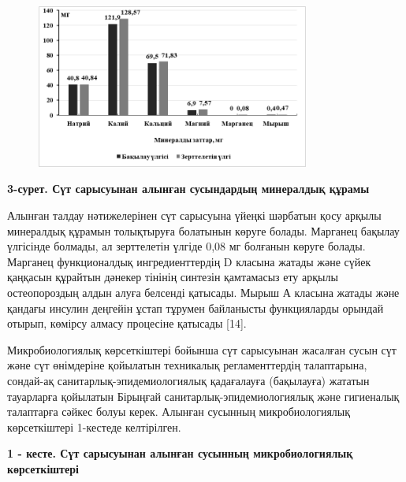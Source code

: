 {{\begin{figure}[H]
	\centering
	\includegraphics[width=0.8\textwidth]{media/pish4/image4}
	\caption*{}
\end{figure}


{\bfseries 3-сурет. Сүт сарысуынан алынған сусындардың минералдық құрамы}

Алынған талдау нәтижелерінен сүт сарысуына үйеңкі шәрбатын қосу арқылы
минералдық құрамын толықтыруға болатынын көруге болады. Марганец бақылау
үлгісінде болмады, ал зерттелетін үлгіде 0,08 мг болғанын көруге болады.
Марганец функционалдық ингредиенттердің D класына жатады және сүйек
қаңқасын құрайтын дәнекер тінінің синтезін қамтамасыз ету арқылы
остеопороздың алдын алуға белсенді қатысады. Мырыш А класына жатады және
қандағы инсулин деңгейін ұстап тұрумен байланысты функцияларды орындай
отырып, көмірсу алмасу процесіне қатысады {[}14{]}.

Микробиологиялық көрсеткіштері бойынша сүт сарысуынан жасалған сусын сүт
және сүт өнімдеріне қойылатын техникалық регламенттердің талаптарына,
сондай-ақ санитарлық-эпидемиологиялық қадағалауға (бақылауға) жататын
тауарларға қойылатын Бірыңғай санитарлық-эпидемиологиялық және
гигиеналық талаптарға сәйкес болуы керек. Алынған сусынның
микробиологиялық көрсеткіштері 1-кестеде келтірілген.

{\bfseries 1 - кесте. Сүт сарысуынан алынған сусынның микробиологиялық
көрсеткіштері}

}}
